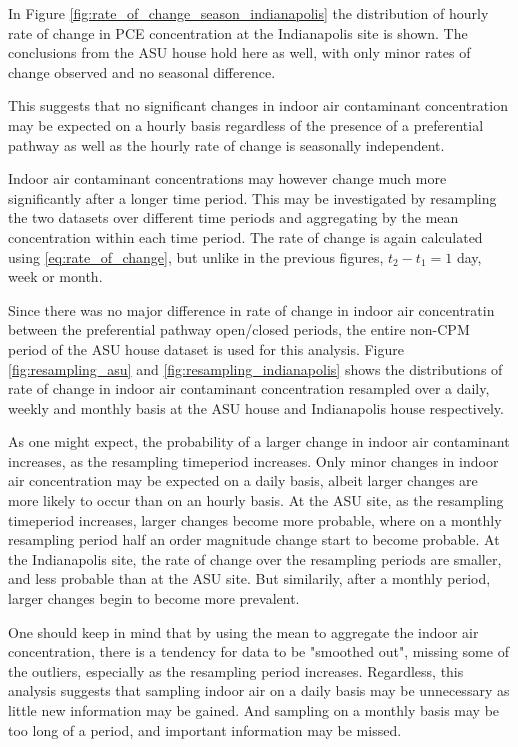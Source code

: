 \documentclass[journal=esthag,manuscript=article]{achemso}
\begin{document}
In Figure \ref{fig:rate_of_change_season_indianapolis} the distribution of hourly rate of change in PCE concentration at the Indianapolis site is shown.
The conclusions from the ASU house hold here as well, with only minor rates of change observed and no seasonal difference.

This suggests that no significant changes in indoor air contaminant concentration may be expected on a hourly basis regardless of the presence of a preferential pathway as well as the hourly rate of change is seasonally independent.

Indoor air contaminant concentrations may however change much more significantly after a longer time period.
This may be investigated by resampling the two datasets over different time periods and aggregating by the mean concentration within each time period.
The rate of change is again calculated using \eqref{eq:rate_of_change}, but unlike in the previous figures, $t_2 - t_1 = 1$ day, week or month.

Since there was no major difference in rate of change in indoor air concentratin between the preferential pathway open/closed periods, the entire non-CPM period of the ASU house dataset is used for this analysis.
Figure \ref{fig:resampling_asu} and \ref{fig:resampling_indianapolis} shows the distributions of rate of change in indoor air contaminant concentration resampled over a daily, weekly and monthly basis at the ASU house and Indianapolis house respectively.

As one might expect, the probability of a larger change in indoor air contaminant increases, as the resampling timeperiod increases.
Only minor changes in indoor air concentration may be expected on a daily basis, albeit larger changes are more likely to occur than on an hourly basis.
At the ASU site, as the resampling timeperiod increases, larger changes become more probable, where on a monthly resampling period half an order magnitude change start to become probable.
At the Indianapolis site, the rate of change over the resampling periods are smaller, and less probable than at the ASU site.
But similarily, after a monthly period, larger changes begin to become more prevalent.

One should keep in mind that by using the mean to aggregate the indoor air concentration, there is a tendency for data to be "smoothed out", missing some of the outliers, especially as the resampling period increases.
Regardless, this analysis suggests that sampling indoor air on a daily basis may be unnecessary as little new information may be gained.
And sampling on a monthly basis may be too long of a period, and important information may be missed.
\end{document}
